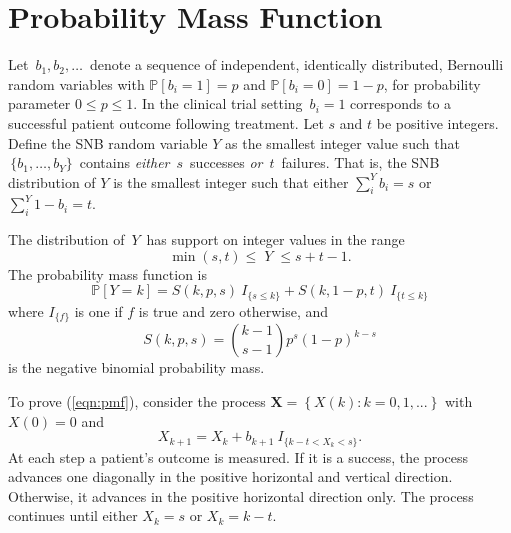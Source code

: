 \documentclass[review]{elsarticle}
\begin{document}
\section{Probability Mass Function}
\label{notation.section}

Let $\,b_1, b_2, \ldots \,$ denote a sequence of independent, identically
distributed, Bernoulli random variables with $\mathbb{P}[b_i=1]=p$ and
$\mathbb{P}[b_i = 0] = 1-p$, for
probability parameter $0\leq p \leq 1$. In the clinical trial setting
$\,b_i = 1$ corresponds to a successful patient outcome following treatment.  
Let $s$ and $t$ be positive integers.  Define the SNB random
variable $Y$ as the smallest
integer value such that $\,\{b_1, \ldots , b_Y\}\,$ contains {\em either}
$\,s\,$ successes {\em or} $\,t\,$ failures. That is, the SNB distribution
of $Y$ is the smallest integer such that either
$\sum_i^Y b_i = s$ or $\sum_i^Y 1-b_i = t$.

The distribution of $\,Y\,$ has support on integer values in the range
\begin{equation*}               
     \min(s,t) \leq \; Y \;\leq s+t-1  \label{range.y.eq}.
\end{equation*}
The probability mass function is
\begin{equation} \label{eqn:pmf}
\mathbb{P} [Y=k] = S(k, p, s) \ I_{\{s \leq k\}} + 
  S(k, 1-p, t) \ I_{\{ t \leq k \}}
\end{equation}
where $I_{\{f\}}$ is one if $f$ is true and zero otherwise, and
\begin{equation} \label{eqn:N}
S(k, p, s) = {k-1 \choose s-1} p^s (1-p)^{k-s} 
\end{equation}
is the negative binomial probability mass.

To prove (\ref{eqn:pmf}), consider the
process $\mathbf{X} = \left\{X(k) : k = 0,1,... \right\}$
with $X(0)=0$ and
\begin{equation*} \label{eqn:proc}
X_{k+1} = X_k + b_{k+1} \ I_{\{ k-t < X_k < s\}}.
\end{equation*}
At each step a patient's outcome is measured. If it is a success, the process 
advances one diagonally in the
positive horizontal and vertical direction.
Otherwise, it advances in the positive horizontal direction only. The
process continues until either $X_k = s$ or $X_k = k-t$.
\end{document}

